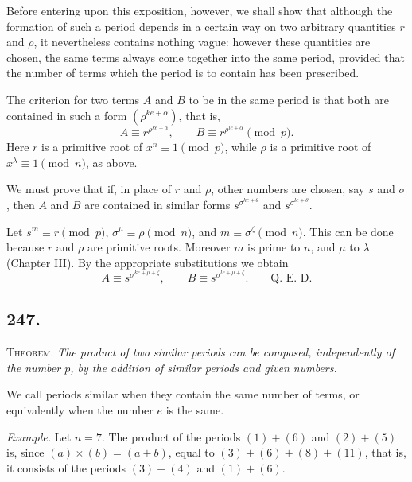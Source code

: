 \documentclass[12pt]{article}
\begin{document}
Before entering upon this exposition, however, we shall show that although the formation of such a period depends in a certain way on two arbitrary quantities $r$ and $\rho$, it nevertheless contains nothing vague: however these quantities are chosen, the same terms always come together into the same period, provided that the number of terms which the period is to contain has been prescribed.

The criterion for two terms $A$ and $B$ to be in the same period is that both are contained in such a form $(\rho^{ke+\alpha})$, that is,
\[
A\equiv r^{\rho^{ke+\alpha}},\qquad B\equiv r^{\rho^{le+\alpha}}\pmod p.
\]
Here $r$ is a primitive root of $x^n\equiv 1\pmod p$, while $\rho$ is a primitive root of $x^\lambda\equiv 1\pmod n$, as above.

We must prove that if, in place of $r$ and $\rho$, other numbers are chosen, say $s$ and $\sigma$, then $A$ and $B$ are contained in similar forms $s^{\sigma^{ke+\theta}}$ and $s^{\sigma^{le+\theta}}$.

Let $s^m\equiv r\pmod p$, $\sigma^\mu\equiv \rho\pmod n$, and $m\equiv \sigma^\zeta\pmod n$. This can be done because $r$ and $\rho$ are primitive roots. Moreover $m$ is prime to $n$, and $\mu$ to $\lambda$ (Chapter III). By the appropriate substitutions we obtain
\[
A\equiv s^{\sigma^{ke+\mu+\zeta}},\qquad B\equiv s^{\sigma^{le+\mu+\zeta}}. \qquad \text{Q. E. D.}
\]

\subsection*{247.}
\textsc{Theorem.} \textit{The product of two similar periods can be composed, independently of the number $p$, by the addition of similar periods and given numbers.}

We call periods similar when they contain the same number of terms, or equivalently when the number $e$ is the same.

\textit{Example.} Let $n=7$. The product of the periods $(1)+(6)$ and $(2)+(5)$ is, since $(a)\times(b)=(a+b)$, equal to $(3)+(6)+(8)+(11)$, that is, it consists of the periods $(3)+(4)$ and $(1)+(6)$.
\end{document}
